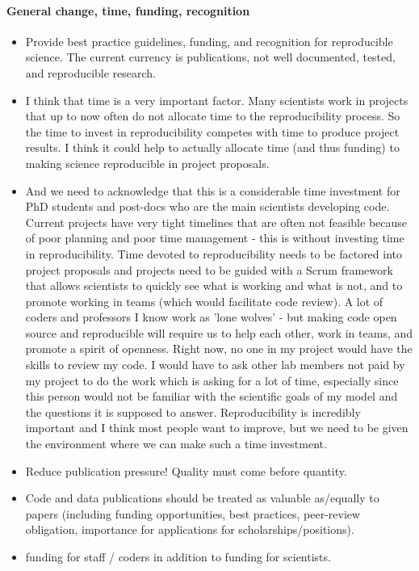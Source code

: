 \documentclass{article}
\begin{document}
\paragraph{General change, time, funding, recognition}
\begin{itemize}
	\item Provide best practice guidelines, funding, and recognition for reproducible science. The current currency is publications, not well documented, tested, and reproducible research.
	\item I think that time is a very important factor. Many scientists work in projects that up to now often do not allocate time to the reproducibility process. So the time to invest in reproducibility competes with time to produce project results. I think it could help to actually allocate time (and thus funding) to making science reproducible in project proposals.
	\item And we need to acknowledge that this is a considerable time investment for PhD students and post-docs who are the main scientists developing code. Current projects have very tight timelines that are often not feasible because of poor planning and poor time management - this is without investing time in reproducibility. Time devoted to reproducibility needs to be factored into project proposals and projects need to be guided with a Scrum framework that allows scientists to quickly see what is working and what is not, and to promote working in teams (which would facilitate code review). A lot of coders and professors I know work as 'lone wolves' - but making code open source and reproducible will require us to help each other, work in teams, and promote a spirit of openness. Right now, no one in my project would have the skills to review my code. I would have to ask other lab members not paid by my project to do the work which is asking for a lot of time, especially since this person would not be familiar with the scientific goals of my model and the questions it is supposed to answer. Reproducibility is incredibly important and I think most people want to improve, but we need to be given the environment where we can make such a time investment. 
	\item Reduce publication pressure! Quality must come before quantity.
	\item Code and data publications should be treated as valuable as/equally to papers (including funding opportunities, best practices, peer-review obligation, importance for applications for scholarships/positions).
	\item funding for staff / coders in addition to funding for scientists.

\end{itemize}
\end{document}
